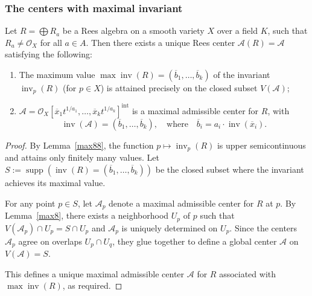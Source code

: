 \documentclass{amsart}
\newcommand{\inv}{{\operatorname{inv}}}
\newcommand{\inte}{{\operatorname{int}}}
\def\supp{{\operatorname{supp}}}
\begin{document}
	


\subsubsection{The centers with maximal invariant}

\begin{proposition}\label{lower0}
Let $R = \bigoplus R_a$ be a Rees algebra on a smooth variety $X$ over a field $K$, such that $R_a \neq \mathcal{O}_X$ for all $a \in A$. Then there exists a unique Rees center $\mathcal{A}(R) = \mathcal{A}$ satisfying the following:
\begin{enumerate}
    \item The maximum value $\max \inv(R) = (\overline{b}_1, \ldots, \overline{b}_k)$ of the invariant $\inv_p(R)$ (for $p \in X$) is attained precisely on the closed subset $V(\mathcal{A})$;
    
    \item $\mathcal{A} = \mathcal{O}_X[\overline{x}_1 t^{1/a_1}, \ldots, \overline{x}_k t^{1/a_k}]^\inte$ is a maximal admissible center for $R$, with
    \[
    \inv(\mathcal{A}) = (\overline{b}_1, \ldots, \overline{b}_k), \quad \text{where} \quad \overline{b}_i = a_i \cdot \inv(\overline{x}_i).
    \]
\end{enumerate}
\end{proposition}

\begin{proof}
By Lemma~\ref{max88}, the function $p \mapsto \inv_p(R)$ is upper semicontinuous and attains only finitely many values. Let 
$
S := \supp (\inv(R)= (\overline{b}_1, \ldots, \overline{b}_k))
$  %
be the closed subset where the invariant achieves its maximal value.

For any point $p \in S$, let $\mathcal{A}_p$ denote a maximal admissible center for $R$ at $p$. By Lemma~\ref{max8}, there exists a neighborhood $U_p$ of $p$ such that $V(\mathcal{A}_p) \cap U_p = S \cap U_p$ and $\mathcal{A}_p$ is uniquely determined on $U_p$. Since the centers $\mathcal{A}_p$ agree on overlaps $U_p \cap U_q$, they glue together to define a global center $\mathcal{A}$ on $V(\mathcal{A}) = S$.

This defines a unique maximal admissible center $\mathcal{A}$ for $R$ associated with $\max \inv(R)$, as required.
\end{proof}
\end{document}
